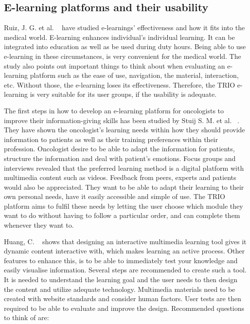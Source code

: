 \documentclass{sigchi}
\begin{document}
\subsection{E-learning platforms and their usability}

Ruiz, J. G. et al. ~\cite{Ruiz2006} have studied e-learnings’ effectiveness and how it fits into the medical world. E-learning enhances individual’s individual learning. It can be integrated into education as well as be used during duty hours. Being able to use e-learning in these circumstances, is very convenient for the medical world. The study also points out important things to think about when evaluating an e-learning platform such as the ease of use, navigation, the material, interaction, etc. Without those, the e-learning loses its effectiveness. Therefore, the TRIO e-learning is very suitable for its user groups, if the usability is adequate. 

The first steps in how to develop an e-learning platform for oncologists to improve their information-giving skills has been studied by Stuij S. M. et al. ~\cite{Stuij2018}. They have shown the oncologist’s learning needs within how they should provide information to patients as well as their training preferences within their profession. Oncologist desire to be able to adapt the information for patients, structure the information and deal with patient’s emotions. Focus groups and interviews revealed that the preferred learning method is a digital platform with multimedia content such as videos. Feedback from peers, experts and patients would also be appreciated. They want to be able to adapt their learning to their own personal needs, have it easily accessible and simple of use. The TRIO platform aims to fulfil these needs by letting the user choose which module they want to do without having to follow a particular order, and can complete them whenever they want to. 

Huang, C. ~\cite{Huang2005} shows that designing an interactive multimedia learning tool gives it dynamic content interactive with, which makes learning an active process. Other features to enhance this, is to be able to immediately test your knowledge and easily visualise information. Several steps are recommended to create such a tool. It is needed to understand the learning goal and the user needs to then design the content and utilize adequate technology. Multimedia materials need to be created with website standards and consider human factors. User tests are then required to be able to evaluate and improve the design. Recommended questions to think of are:
\end{document}

